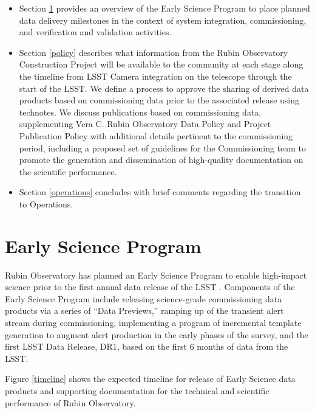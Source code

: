 \documentclass[SE,authoryear,toc,lsstdraft]{lsstdoc}
\begin{document}
\begin{itemize}

  \item Section \ref{early_science} provides an overview of the Early Science Program to place planned data delivery milestones in the context of system integration, commissioning, and verification and validation activities.

  \item Section \ref{policy} describes what information from the Rubin Observatory Construction Project will be available to the community at each stage along the timeline from LSST Camera integration on the telescope through the start of the LSST.
  We define a process to approve the sharing of derived data products based on commissioning data prior to the associated release using technotes.
  We discuss publications based on commissioning data, supplementing Vera C. Rubin Observatory Data Policy  and Project Publication Policy \citep{LPM-162} with additional details pertinent to the commissioning period, including a proposed set of guidelines for the Commissioning team to promote the generation and dissemination of high-quality documentation on the scientific performance.

  \item Section \ref{operations} concludes with brief comments regarding the transition to Operations.

\end{itemize}

\section{Early Science Program}
\label{early_science}

Rubin Observatory has planned an Early Science Program to enable high-impact science prior to the first annual data release of the LSST . Components of the Early Science Program include releasing science-grade commissioning data products via a series of ``Data Previews,'' ramping up of the transient alert stream during commissioning, implementing a program of incremental template generation to augment alert production in the early phases of the survey, and the first LSST Data Release, DR1, based on the first 6 months of data from the LSST.

Figure \ref{timeline} shows the expected timeline for release of Early Science data products and supporting documentation for the technical and scientific performance of Rubin Observatory.
\end{document}
